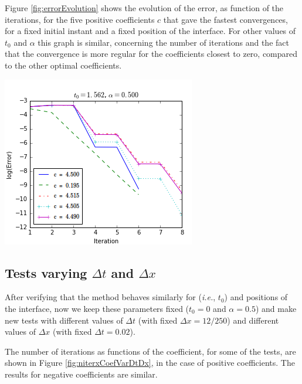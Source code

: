\addtocounter{figure}{-1}
\endgroup

\indent Figure \ref{fig:errorEvolution} shows the evolution of the error, as function of the iterations, for the five positive coefficients $c$ that gave the fastest convergences, for a fixed initial instant and a fixed position of the interface. For other values of $t_0$ and $\alpha$ this graph is similar, concerning the number of iterations and the fact that the convergence is more regular for the coefficients closest to zero, compared to the other optimal coefficients.

\begingroup
\begin{center}
\includegraphics[scale=.5]{Fig4.png}
\end{center}
\endgroup

\subsection{Tests varying $\Delta t$ and $\Delta x$}

\indent After verifying that the method behaves similarly for  (\emph{i.e.},  $t_0$) and  positions of the interface, now we keep these parameters fixed ($t_0 = 0$ and $\alpha = 0.5$) and make new tests with different values of $\Delta t$ (with fixed $\Delta x = 12/250$) and different values of $\Delta x$ (with fixed $\Delta t = 0.02$).

\indent The number of iterations as functions of the coefficient, for some of the tests, are shown in Figure \ref{fig:niterxCoefVarDtDx}, in the case of positive coefficients. The results for negative coefficients are similar.

